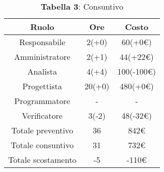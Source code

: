 \begin{table}[H]
	\centering
	\renewcommand{\arraystretch}{1.5}
	\begin{tabular}{|c|c|c|}
		\hline
		\rowcolor{lighter-grayer}
		Ruolo & Ore & Costo \\ \hline
		Responsabile & 2(+0) & 60(+0\euro) \\ \hline
		Amministratore & 2(+1) & 44(+22\euro) \\ \hline
		Analista & 4(+4) & 100(-100\euro) \\ \hline
		Progettista & 20(+0) & 480(+0\euro) \\ \hline
		Programmatore & - & - \\ \hline
		Verificatore & 3(-2) & 48(-32\euro) \\ \hline
		Totale preventivo & 36 & 842\euro \\ \hline
		Totale consuntivo & 31 & 732\euro \\ \hline
		Totale scostamento & -5 & -110\euro \\ \hline
	\end{tabular}
	\caption*{\textbf{Tabella 3}: Consuntivo\\}
\end{table}

